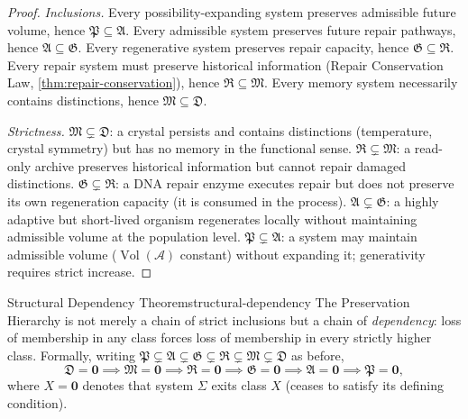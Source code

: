 \documentclass[12pt,twoside,openright]{book}
\newcommand{\adm}{\mathcal{A}}
\newcommand{\Vol}{\operatorname{Vol}}
\begin{document}
\begin{proof}
  \textit{Inclusions.}
  Every possibility-expanding system preserves admissible
  future volume, hence $\mathfrak{P} \subseteq \mathfrak{A}$.
  Every admissible system preserves future repair pathways,
  hence $\mathfrak{A} \subseteq \mathfrak{G}$.
  Every regenerative system preserves repair capacity,
  hence $\mathfrak{G} \subseteq \mathfrak{R}$.
  Every repair system must preserve historical information
  (Repair Conservation Law, \cref{thm:repair-conservation}),
  hence $\mathfrak{R} \subseteq \mathfrak{M}$.
  Every memory system necessarily contains distinctions,
  hence $\mathfrak{M} \subseteq \mathfrak{D}$.

  \textit{Strictness.}
  $\mathfrak{M} \subsetneq \mathfrak{D}$:
  a crystal persists and contains distinctions (temperature,
  crystal symmetry) but has no memory in the functional sense.
  $\mathfrak{R} \subsetneq \mathfrak{M}$:
  a read-only archive preserves historical information but
  cannot repair damaged distinctions.
  $\mathfrak{G} \subsetneq \mathfrak{R}$:
  a DNA repair enzyme executes repair but does not
  preserve its own regeneration capacity
  (it is consumed in the process).
  $\mathfrak{A} \subsetneq \mathfrak{G}$:
  a highly adaptive but short-lived organism regenerates
  locally without maintaining admissible volume
  at the population level.
  $\mathfrak{P} \subsetneq \mathfrak{A}$:
  a system may maintain admissible volume ($\Vol(\adm)$
  constant) without expanding it; generativity requires
  strict increase.
\end{proof}

\begin{theorem}{Structural Dependency Theorem}{structural-dependency}
  The Preservation Hierarchy is not merely a chain of
  strict inclusions but a chain of \emph{dependency}: loss
  of membership in any class forces loss of membership in
  every strictly higher class. Formally, writing
  $\mathfrak{P}\subsetneq\mathfrak{A}\subsetneq\mathfrak{G}
  \subsetneq\mathfrak{R}\subsetneq\mathfrak{M}\subsetneq\mathfrak{D}$
  as before,
  \[
    \mathfrak{D} = \mathbf{0}
    \implies \mathfrak{M} = \mathbf{0}
    \implies \mathfrak{R} = \mathbf{0}
    \implies \mathfrak{G} = \mathbf{0}
    \implies \mathfrak{A} = \mathbf{0}
    \implies \mathfrak{P} = \mathbf{0},
  \]
  where $X = \mathbf{0}$ denotes that system $\Sigma$ exits
  class $X$ (ceases to satisfy its defining condition).
\end{theorem}
\end{document}
